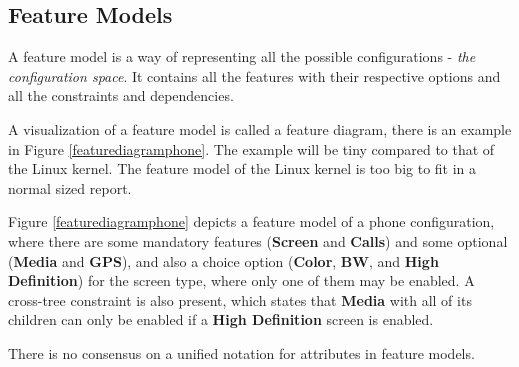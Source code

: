 \documentclass[a4paper,11pt]{report}
\begin{document}
        \subsection{Feature Models}

A feature model is a way of representing all the possible configurations - 
\emph{the configuration space}. It contains all the features with their 
respective options and all the constraints and dependencies.

A visualization of a feature model is called a feature diagram, there is an 
example in Figure \ref{featurediagramphone}. The example 
will be tiny compared to that of the Linux kernel. The feature model of the 
Linux kernel is too big to fit in a normal sized report.

Figure \ref{featurediagramphone} depicts a feature model of a phone 
configuration, where there are some mandatory features (\textbf{Screen} and 
\textbf{Calls}) and some optional (\textbf{Media} and \textbf{GPS}), and also a 
choice option (\textbf{Color}, \textbf{BW}, and \textbf{High Definition}) for 
the screen type, where only one of them may be enabled. A cross-tree constraint 
is also present, which states that \textbf{Media} with all of its children can 
only be enabled if a \textbf{High Definition} screen is enabled.

There is no consensus on a unified notation for attributes in feature 
models\cite{AAFM}.
\end{document}
